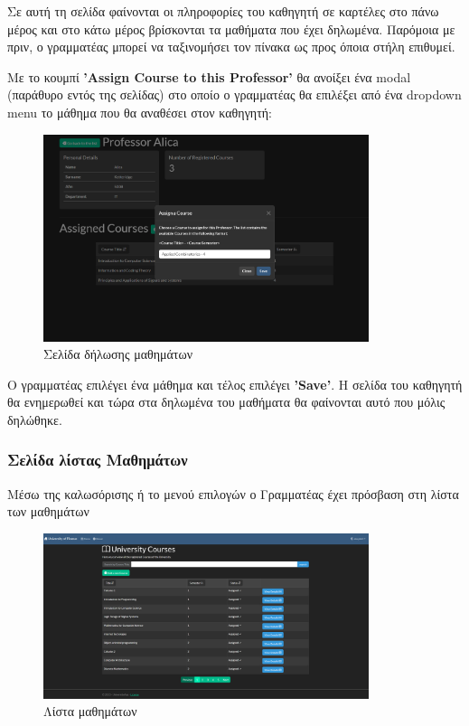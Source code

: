 \documentclass[12pt]{article}
\begin{document}
\begin{enumerate}
		Σε αυτή τη σελίδα φαίνονται οι πληροφορίες του καθηγητή σε καρτέλες στο πάνω μέρος και στο κάτω μέρος βρίσκονται τα μαθήματα που έχει δηλωμένα. Παρόμοια με πριν, ο γραμματέας μπορεί να ταξινομήσει τον πίνακα ως προς όποια στήλη επιθυμεί.
				
		Με το κουμπί \textbf{'Assign Course to this Professor'} θα ανοίξει ένα modal (παράθυρο εντός της σελίδας) στο οποίο ο γραμματέας θα επιλέξει από ένα dropdown menu το μάθημα που θα αναθέσει στον καθηγητή:
		
		\begin{figure}[H]
			\centering
			\includegraphics[width=0.85\textwidth]{mm.png}
			\caption{Σελίδα δήλωσης μαθημάτων}
			\label{fig:emptyView}
		\end{figure}
		
		Ο γραμματέας επιλέγει ένα μάθημα και τέλος επιλέγει \textbf{'Save'}. Η σελίδα του καθηγητή θα ενημερωθεί και τώρα στα δηλωμένα του μαθήματα θα φαίνονται αυτό που μόλις δηλώθηκε.
	\end{enumerate}
	
		
	\subsubsection{Σελίδα λίστας Μαθημάτων}

	Μέσω της καλωσόρισης ή το μενού επιλογών ο Γραμματέας έχει πρόσβαση στη λίστα των μαθημάτων

\begin{figure}[H]
	\centering
	\includegraphics[width=0.85\textwidth]{less.png}
	\caption{Λίστα μαθημάτων}
	\label{fig:emptyView}
\end{figure}
\end{document}

